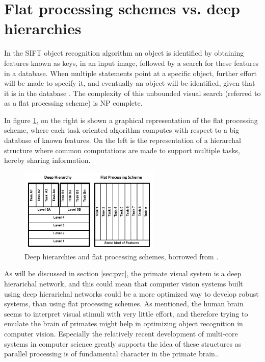 \section{Flat processing schemes vs. deep hierarchies}
\label{sec:deep_hierarchies}
In the SIFT object recognition algorithm an object is identified
by obtaining features known as keys, in an input image,
followed by a search for these features in a database.
When multiple statements point at a specific object,
further effort will be made to specify it, and eventually an object will be identified,
given that it is in the database \citep{sift}.
The complexity of this unbounded visual search (referred to as a flat processing scheme)
is NP complete\citep{fidler2009learning}.

In figure \ref{fig:deepvsflat}, on the right is shown a graphical representation of the flat processing scheme,
where each task oriented algorithm computes with respect to a big database of known features.
On the left is the representation of a hierarchal structure where common computations are made to support multiple tasks,
hereby sharing information.

\begin{figure}[h!] %
\centering
\includegraphics[width=0.6\textwidth]{graphics/deepvsflat}
\caption[Deep hierarchies and flat processing schemes]{Deep hierarchies and flat processing schemes, borrowed from \citet{kruger2013deep}.}
\label{fig:deepvsflat}
\end{figure}

As will be discussed in section \ref{sec:pvc}, the primate visual system
is a deep hierarichal network, and this could mean that
computer vision systems built using deep hierarichal networks could
be a more optimized way to develop robust systems, than using flat processing schemes.
As mentioned, the human brain seems to interpret visual stimuli with very little effort,
and therefore trying to emulate the brain of primates might help in optimizing object recognition in computer vision.
Especially the relatively recent development of multi-core systems in computer science
greatly supports the idea of these structures as parallel processing is of fundamental character in the primate brain.\citep{fidler2009learning}.


